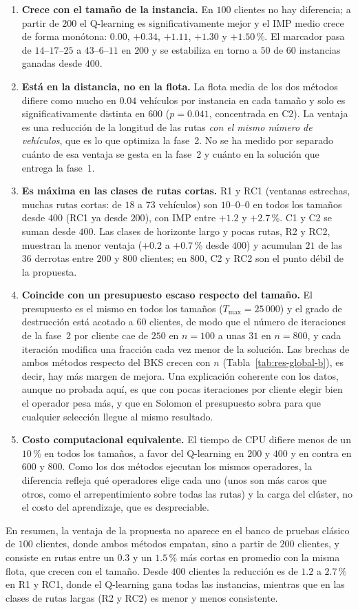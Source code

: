 \begin{enumerate}
\item \textbf{Crece con el tamaño de la instancia.} En $100$ clientes no hay diferencia; a
partir de $200$ el Q-learning es significativamente mejor y el IMP medio crece de forma
monótona: $0.00$, $+0.34$, $+1.11$, $+1.30$ y $+1.50$\,\%. El marcador pasa de
$14$--$17$--$25$ a $43$--$6$--$11$ en $200$ y se estabiliza en torno a $50$ de $60$
instancias ganadas desde $400$.
\item \textbf{Está en la distancia, no en la flota.} La flota media de los dos métodos
difiere como mucho en $0.04$ vehículos por instancia en cada tamaño y solo es
significativamente distinta en $600$ ($p=0.041$, concentrada en C2). La ventaja es una
reducción de la longitud de las rutas \emph{con el mismo número de vehículos}, que es lo que
optimiza la fase~2. No se ha medido por separado cuánto de esa ventaja se gesta en la fase~2 y
cuánto en la solución que entrega la fase~1.
\item \textbf{Es máxima en las clases de rutas cortas.} R1 y RC1 (ventanas estrechas, muchas
rutas cortas: de $18$ a $73$ vehículos) son $10$--$0$--$0$ en todos los tamaños desde $400$
(RC1 ya desde $200$), con IMP entre $+1.2$ y $+2.7$\,\%. C1 y C2 se suman desde $400$. Las
clases de horizonte largo y pocas rutas, R2 y RC2, muestran la menor ventaja ($+0.2$ a
$+0.7$\,\% desde $400$) y acumulan $21$ de las $36$ derrotas entre $200$ y $800$ clientes; en
$800$, C2 y RC2 son el punto débil de la propuesta.
\item \textbf{Coincide con un presupuesto escaso respecto del tamaño.} El presupuesto es el
mismo en todos los tamaños ($T_{\max}=25\,000$) y el grado de destrucción está acotado a $60$
clientes, de modo que el número de iteraciones de la fase~2 por cliente cae de $250$ en
$n=100$ a unas $31$ en $n=800$, y cada iteración modifica una fracción cada vez menor de la solución. Las
brechas de ambos métodos respecto del BKS crecen con $n$ (Tabla~\ref{tab:res-global-b}), es
decir, hay más margen de mejora. Una explicación coherente con los datos, aunque no probada
aquí, es que con pocas iteraciones por cliente elegir bien el operador pesa más, y que en
Solomon el presupuesto sobra para que cualquier selección llegue al mismo resultado.
\item \textbf{Costo computacional equivalente.} El tiempo de CPU difiere menos de un $10$\,\%
en todos los tamaños, a favor del Q-learning en $200$ y $400$ y en contra en $600$ y $800$.
Como los dos métodos ejecutan los mismos operadores, la diferencia refleja qué operadores
elige cada uno (unos son más caros que otros, como el arrepentimiento sobre todas las rutas)
y la carga del clúster, no el costo del aprendizaje, que es despreciable.
\end{enumerate}

En resumen, la ventaja de la propuesta no aparece en el banco de pruebas clásico de $100$
clientes, donde ambos métodos empatan, sino a partir de $200$ clientes, y consiste en rutas
entre un $0.3$ y un $1.5$\,\% más cortas en promedio con la misma flota, que crecen con el
tamaño. Desde $400$ clientes la reducción es de $1.2$ a $2.7$\,\% en R1 y RC1, donde el
Q-learning gana todas las instancias, mientras que en las clases de rutas largas (R2 y RC2)
es menor y menos consistente.
